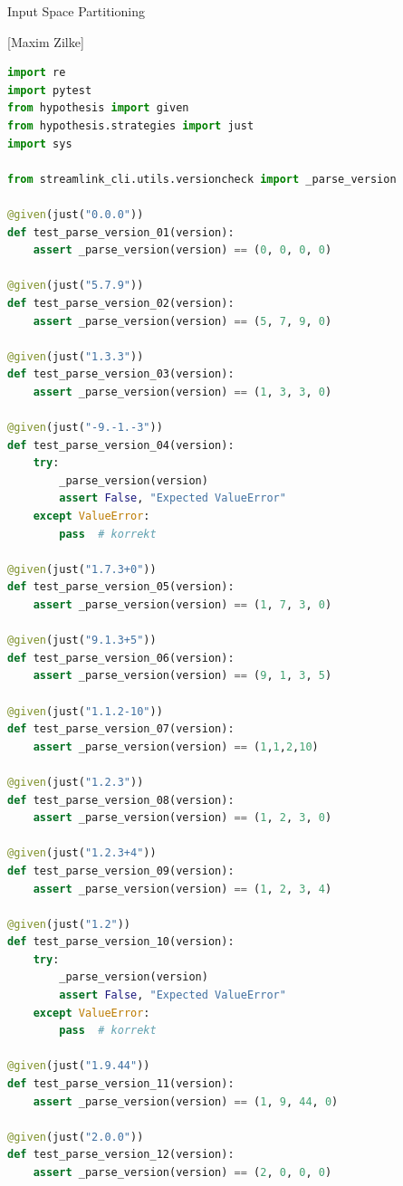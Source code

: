 \documentclass[a4paper]{scrreprt}
\newcounter{question}
\begin{document}
\begin{question}{Input Space Partitioning}
\begin{enumerate}[topsep=0pt, leftmargin=*]
\begin{answer}
            [Maxim Zilke] 
\begin{lstlisting}[language=Python]
import re
import pytest
from hypothesis import given
from hypothesis.strategies import just
import sys

from streamlink_cli.utils.versioncheck import _parse_version

@given(just("0.0.0"))
def test_parse_version_01(version):
    assert _parse_version(version) == (0, 0, 0, 0)

@given(just("5.7.9"))
def test_parse_version_02(version):
    assert _parse_version(version) == (5, 7, 9, 0)

@given(just("1.3.3"))
def test_parse_version_03(version):
    assert _parse_version(version) == (1, 3, 3, 0)

@given(just("-9.-1.-3"))
def test_parse_version_04(version):
    try:
        _parse_version(version)
        assert False, "Expected ValueError"
    except ValueError:
        pass  # korrekt

@given(just("1.7.3+0"))
def test_parse_version_05(version):
    assert _parse_version(version) == (1, 7, 3, 0)

@given(just("9.1.3+5"))
def test_parse_version_06(version):
    assert _parse_version(version) == (9, 1, 3, 5)

@given(just("1.1.2-10"))
def test_parse_version_07(version):
    assert _parse_version(version) == (1,1,2,10)

@given(just("1.2.3"))
def test_parse_version_08(version):
    assert _parse_version(version) == (1, 2, 3, 0)

@given(just("1.2.3+4"))
def test_parse_version_09(version):
    assert _parse_version(version) == (1, 2, 3, 4)

@given(just("1.2"))
def test_parse_version_10(version):
    try:
        _parse_version(version)
        assert False, "Expected ValueError"
    except ValueError:
        pass  # korrekt

@given(just("1.9.44"))
def test_parse_version_11(version):
    assert _parse_version(version) == (1, 9, 44, 0)

@given(just("2.0.0"))
def test_parse_version_12(version):
    assert _parse_version(version) == (2, 0, 0, 0)


\end{lstlisting}
\end{answer}
\end{enumerate}
\end{question}
\end{document}
